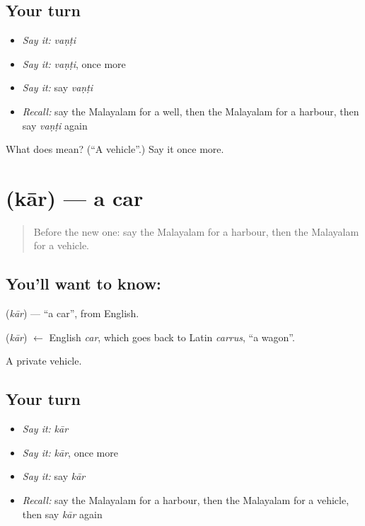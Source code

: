 \subsection*{Your turn}
\begin{itemize}
\raggedright
  \item \emph{Say it:} \emph{vaṇṭi}
  \item \emph{Say it:} \emph{vaṇṭi}, once more
  \item \emph{Say it:} say \emph{vaṇṭi}
  \item \emph{Recall:} say the Malayalam for a well, then the Malayalam for a harbour, then say \emph{vaṇṭi} again
\end{itemize}

\begin{tcolorbox}[breakable,colback=teal!4,colframe=teal!35!black,title={Before you move on}]
What does  mean? (\textquotedblleft{}A vehicle\textquotedblright{}.) Say it once more.
\end{tcolorbox}
\section[\texorpdfstring{\ml{കാർ} (kār)}{കാർ (kār)}]{ (kār) — a car}

\label{lesson:ML-C137-car}



\begin{quote}
Before the new one: say the Malayalam for a harbour, then the Malayalam for a vehicle.
\end{quote}

\subsection*{You'll want to know: }
\textbf{} (\emph{kār}) — \textquotedblleft{}a car\textquotedblright{}, from English.

\begin{cousinweb}
\textbf{} (\emph{kār}) $\leftarrow$ English \emph{car}, which goes back to Latin \emph{carrus}, \textquotedblleft{}a wagon\textquotedblright{}.
\end{cousinweb}

\begin{grammarlens}[title={What you've built}]
A private vehicle.
\end{grammarlens}

\subsection*{Your turn}
\begin{itemize}
\raggedright
  \item \emph{Say it:} \emph{kār}
  \item \emph{Say it:} \emph{kār}, once more
  \item \emph{Say it:} say \emph{kār}
  \item \emph{Recall:} say the Malayalam for a harbour, then the Malayalam for a vehicle, then say \emph{kār} again
\end{itemize}

